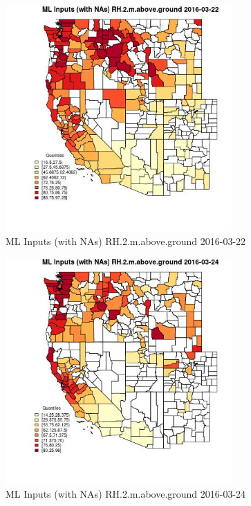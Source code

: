 \begin{figure} 
\centering  
\includegraphics[width=0.77\textwidth]{Code_Outputs/Report_ML_input_PM25_Step4_part_e_de_duplicated_aveswNAs_CountyRH2mabovegroundMean2016-03-22_2016-03-22.jpg} 
\caption{\label{fig:Report_ML_input_PM25_Step4_part_e_de_duplicated_aveswNAsCountyRH2mabovegroundMean2016-03-22_2016-03-22}ML Inputs (with NAs) RH.2.m.above.ground 2016-03-22} 
\end{figure} 
 

\begin{figure} 
\centering  
\includegraphics[width=0.77\textwidth]{Code_Outputs/Report_ML_input_PM25_Step4_part_e_de_duplicated_aveswNAs_CountyRH2mabovegroundMean2016-03-24_2016-03-24.jpg} 
\caption{\label{fig:Report_ML_input_PM25_Step4_part_e_de_duplicated_aveswNAsCountyRH2mabovegroundMean2016-03-24_2016-03-24}ML Inputs (with NAs) RH.2.m.above.ground 2016-03-24} 
\end{figure} 
 

